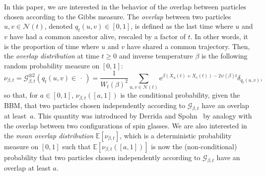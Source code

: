 \documentclass[AHL,Unicode,longabstracts,published]{cedram}
\newcommand{\e}{\mathrm{e}}
\newcommand{\E}{\mathbb{E}}
\newcommand\1{\mathds{1}}
\newcommand{\cG}{\mathcal{G}}
\newcommand{\cN}{\mathcal{N}}
\begin{document}
In this paper, we are interested in the behavior of the overlap between particles chosen according to the Gibbs measure. The \emph{overlap} between two particles ${u, v \in \cN(t)}$, denoted $q_t(u, v) \in [0,1]$, is defined as the last time where $u$ and $v$ have had a common ancestor alive, rescaled by a factor of $t$. In other words, it is the proportion of time where $u$ and $v$ have shared a common trajectory. Then, the \emph{overlap distribution} at time $t \geq 0$ and inverse temperature $\beta$ is the following random probability measure on $[0,1]$:
\begin{equation}\label{eq:def_overlap_dist}
\nu_{\beta, t} = \cG_{\beta, t}^{\otimes 2}(q_t(u, v) \in \,\cdot\,) = \frac{1}{W_t(\beta)^2} \sum_{u, v \in \cN(t)} \e^{\beta(X_u(t) + X_v(t)) - 2 \psi(\beta) t} \delta_{q_t(u, v)},
\end{equation}
so that, for $a \in [0,1]$, $\nu_{\beta, t}([a,1])$ is the conditional probability, given the BBM, that two particles chosen independently according to $\cG_{\beta,t}$ have an overlap at least~$a$. This quantity was introduced by Derrida and Spohn~\cite{DerridaSpohn1988} by analogy with the overlap between two configurations of spin glasses. We are also interested in the \emph{mean overlap distribution} $\E[\nu_{\beta, t}]$, which is a deterministic probability measure on $[0,1]$ such that $\E[\nu_{\beta, t}([a,1])]$ is now the (non-conditional) probability that two particles chosen independently according to $\cG_{\beta,t}$ have an overlap at least $a$.
\end{document}
